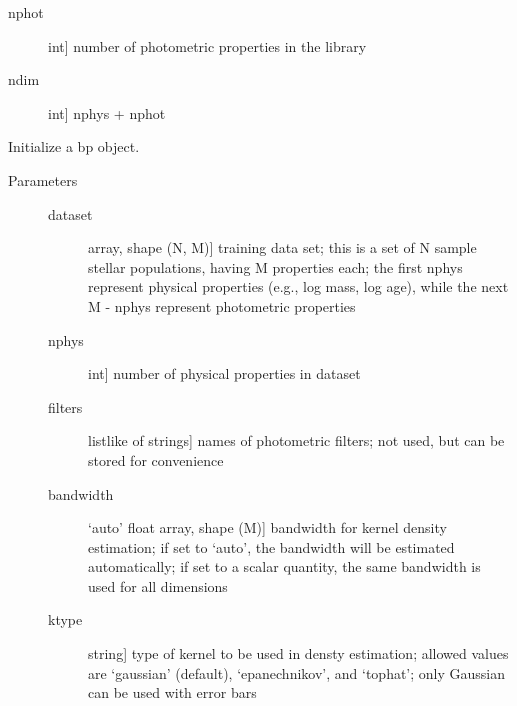 \documentclass[letterpaper,10pt,english]{sphinxmanual}
\begin{document}
\begin{fulllineitems}
\begin{description}
\begin{description}
\item[{nphot}] \leavevmode{[}int{]}
number of photometric properties in the library

\item[{ndim}] \leavevmode{[}int{]}
nphys + nphot

\end{description}

\end{description}

\begin{fulllineitems}
\label{\detokenize{bayesphot:slugpy.bayesphot.bp.bp.__init__}}
Initialize a bp object.
\begin{description}
\item[{Parameters}] \leavevmode\begin{description}
\item[{dataset}] \leavevmode{[}array, shape (N, M){]}
training data set; this is a set of N sample stellar
populations, having M properties each; the first nphys
represent physical properties (e.g., log mass, log age),
while the next M - nphys represent photometric
properties

\item[{nphys}] \leavevmode{[}int{]}
number of physical properties in dataset

\item[{filters}] \leavevmode{[}listlike of strings{]}
names of photometric filters; not used, but can be
stored for convenience

\item[{bandwidth}] \leavevmode{[}‘auto’ \textbar{} float \textbar{} array, shape (M){]}
bandwidth for kernel density estimation; if set to
‘auto’, the bandwidth will be estimated automatically; if
set to a scalar quantity, the same bandwidth is used for all
dimensions

\item[{ktype}] \leavevmode{[}string{]}
type of kernel to be used in densty estimation; allowed
values are ‘gaussian’ (default), ‘epanechnikov’, and
‘tophat’; only Gaussian can be used with error bars


\end{description}
\end{description}
\end{fulllineitems}
\end{fulllineitems}
\end{document}
